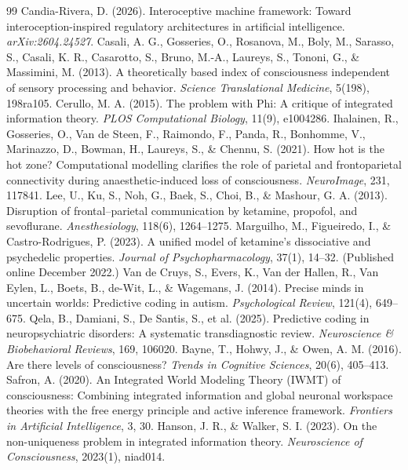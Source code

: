 \documentclass[11pt]{article}
\begin{document}
\begin{thebibliography}{99}
 Candia-Rivera, D. (2026). Interoceptive machine framework: Toward interoception-inspired regulatory architectures in artificial intelligence. \emph{arXiv:2604.24527}.
 Casali, A. G., Gosseries, O., Rosanova, M., Boly, M., Sarasso, S., Casali, K. R., Casarotto, S., Bruno, M.-A., Laureys, S., Tononi, G., \& Massimini, M. (2013). A theoretically based index of consciousness independent of sensory processing and behavior. \emph{Science Translational Medicine}, 5(198), 198ra105.
 Cerullo, M. A. (2015). The problem with Phi: A critique of integrated information theory. \emph{PLOS Computational Biology}, 11(9), e1004286.
 Ihalainen, R., Gosseries, O., Van de Steen, F., Raimondo, F., Panda, R., Bonhomme, V., Marinazzo, D., Bowman, H., Laureys, S., \& Chennu, S. (2021). How hot is the hot zone? Computational modelling clarifies the role of parietal and frontoparietal connectivity during anaesthetic-induced loss of consciousness. \emph{NeuroImage}, 231, 117841.
 Lee, U., Ku, S., Noh, G., Baek, S., Choi, B., \& Mashour, G. A. (2013). Disruption of frontal--parietal communication by ketamine, propofol, and sevoflurane. \emph{Anesthesiology}, 118(6), 1264--1275.
 Marguilho, M., Figueiredo, I., \& Castro-Rodrigues, P. (2023). A unified model of ketamine's dissociative and psychedelic properties. \emph{Journal of Psychopharmacology}, 37(1), 14--32. (Published online December 2022.)
 Van de Cruys, S., Evers, K., Van der Hallen, R., Van Eylen, L., Boets, B., de-Wit, L., \& Wagemans, J. (2014). Precise minds in uncertain worlds: Predictive coding in autism. \emph{Psychological Review}, 121(4), 649--675.
 Qela, B., Damiani, S., De Santis, S., et al. (2025). Predictive coding in neuropsychiatric disorders: A systematic transdiagnostic review. \emph{Neuroscience \& Biobehavioral Reviews}, 169, 106020.
 Bayne, T., Hohwy, J., \& Owen, A. M. (2016). Are there levels of consciousness? \emph{Trends in Cognitive Sciences}, 20(6), 405--413.
 Safron, A. (2020). An Integrated World Modeling Theory (IWMT) of consciousness: Combining integrated information and global neuronal workspace theories with the free energy principle and active inference framework. \emph{Frontiers in Artificial Intelligence}, 3, 30.
 Hanson, J. R., \& Walker, S. I. (2023). On the non-uniqueness problem in integrated information theory. \emph{Neuroscience of Consciousness}, 2023(1), niad014.

\end{thebibliography}
\end{document}
